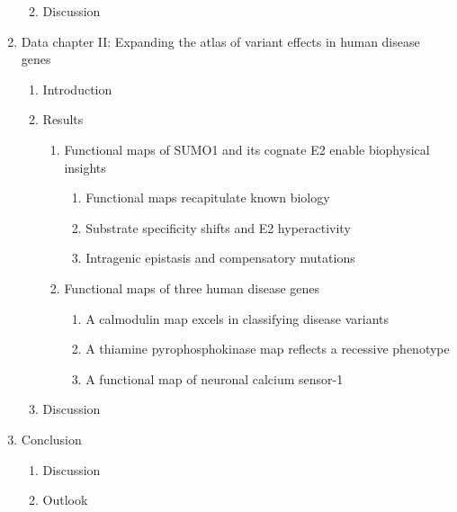 \documentclass[12pt]{article}
\begin{document}
\begin{enumerate}
\begin{enumerate}
\begin{enumerate}
		\end{enumerate}
		\item Discussion
	\end{enumerate}
	\item Data chapter II: Expanding the atlas of variant effects in human disease genes
	\begin{enumerate}
		\item Introduction
		\item Results
		\begin{enumerate}
			\item Functional maps of SUMO1 and its cognate E2 enable biophysical insights
			\begin{enumerate}
				\item Functional maps recapitulate known biology
				\item Substrate specificity shifts and E2 hyperactivity
				\item Intragenic epistasis and compensatory mutations
			\end{enumerate}
			\item Functional maps of three human disease genes
			\begin{enumerate}
				\item A calmodulin map excels in classifying disease variants
				\item A thiamine pyrophosphokinase map reflects a recessive phenotype
				\item A functional map of neuronal calcium sensor-1
			\end{enumerate}
		\end{enumerate}
		\item Discussion
	\end{enumerate}
	\item Conclusion
	\begin{enumerate}
		\item Discussion
		\item Outlook
	\end{enumerate}
\end{enumerate}
\end{document}
